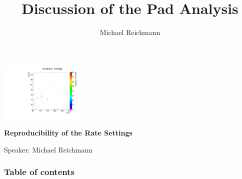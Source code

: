 \documentclass[9pt]{beamer}
\title[Analysis]{Discussion of the Pad Analysis}
\author[M. Reichmann]{Michael Reichmann}
\institute[\textbf{\textit{ETH}}\scalebox{.6}{\textit{Z\"{u}rich}}]{Swiss Federal Institute of Technology Zurich}
\begin{document}
\begin{frame}
	\begin{center}
		\includegraphics[angle=270, width=4cm]{CollimatorSettings}
	\end{center}
	\begin{alertblock}{
		\begin{center}
			\textbf{Reproducibility of the Rate Settings}
		\end{center}}
		\vspace*{10pt}
		\begin{center}\small
		Speaker: Michael Reichmann
		\end{center}\normalsize
	\end{alertblock}
\end{frame}
\usebackgroundtemplate{}
\begin{frame}[allowframebreaks]
	\frametitle{Table of contents}
	\tableofcontents   %
\end{frame}
\end{document}
